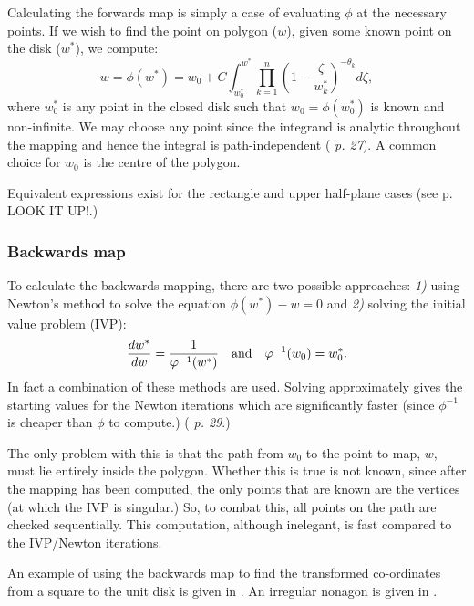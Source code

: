 Calculating the forwards map is simply a case of evaluating $\phi$ at the necessary points. If we wish to find the point on polygon ($w$), given some known point on the disk ($w^*$), we compute:
\begin{equation}
\label{forwardsmap}
w=\phi(w^*) = w_0 + C \int_{w^*_0}^{w^*} \prod_{k=1}^{n} (1 - \frac{\zeta}{w^*_k})^{-\theta_k} d\zeta,
\end{equation}
where $w^*_0$ is any point in the closed disk such that $w_0 = \phi(w^*_0)$ is known and non-infinite. We may choose any point since the integrand is analytic throughout the mapping and hence the integral is path-independent (\cite{driscoll} \emph{p. 27}). A common choice for $w_0$ is the centre of the polygon.

Equivalent expressions exist for the rectangle and upper half-plane cases (see \cite{driscoll} p. LOOK IT UP!.)

\subsubsection{Backwards map}

To calculate the backwards mapping, there are two possible approaches: \emph{1)} using Newton's method to solve the equation $\phi(w^*)-w=0$ and \emph{2)} solving the initial value problem (IVP):
\begin{equation}
\label{scivp}
\frac{dw^*}{dw}=\frac{1}{\varphi^{-1}(w^*)} \quad \text{and} \quad \varphi^{-1}(w_0)=w^*_0.
\end{equation}
In fact a combination of these methods are used. Solving  approximately gives the starting values for the Newton iterations which are significantly faster (since $\phi^{-1}$ is cheaper than $\phi$ to compute.) (\cite{driscoll} \emph{p. 29}.)

The only problem with this is that the path from $w_0$ to the point to map, $w$, must lie entirely inside the polygon. Whether this is true is not known, since after the mapping has been computed, the only points that are known are the vertices (at which the IVP is singular.) So, to combat this, all points on the path are checked sequentially. This computation, although inelegant, is fast compared to the IVP/Newton iterations.

An example of using the backwards map to find the transformed co-ordinates from a square to the unit disk is given in . An irregular nonagon is given in .


